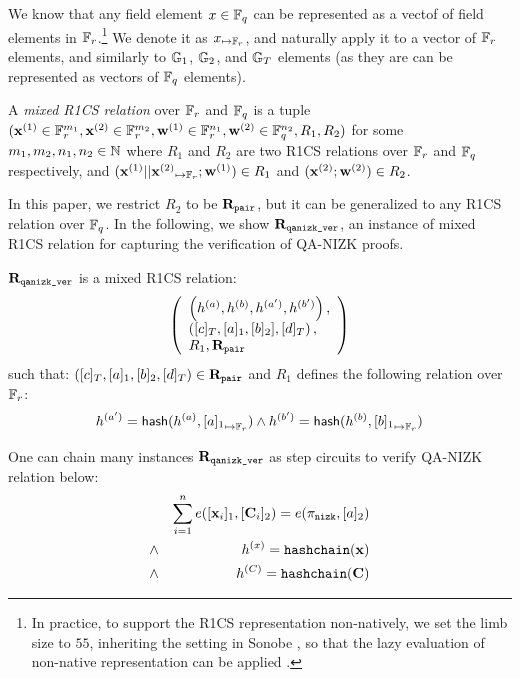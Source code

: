 We know that any field element $x \in \mathbb{F}_q$ can be represented as 
a vectof of field elements in $\mathbb{F}_r$.\footnote{In practice, to support
the R1CS representation non-natively, we set the limb size to $55$,
inheriting the setting in Sonobe \cite{Sonobe}, so that the lazy evaluation
of non-native representation can be applied \cite{JSnark}.}
We denote it as ${x}_{\mapsto \mathbb{F}_r}$, and naturally apply it to a vector
of $\mathbb{F}_r$ elements, and similarly to ${\mathbb{G}}_1$, ${\mathbb{G}}_2$, and ${\mathbb{G}}_T$
elements (as they are can be represented as vectors of $\mathbb{F}_q$ elements).

\begin{definition} A {\em mixed R1CS relation} over $\mathbb{F}_r$ and $\mathbb{F}_q$
is a tuple $({{\mathbf {x}}}^{(1)} \in \mathbb{F}_r^{m_1}, {{\mathbf {x}}}^{(2)} \in \mathbb{F}_r^{m_2}, 
{{\mathbf {w}}}^{(1)} \in \mathbb{F}_r^{n_1}, {{\mathbf {w}}}^{(2)} \in \mathbb{F}_q^{n_2}, R_1, R_2)$
for some $m_1, m_2, n_1, n_2 \in \mathbb{N}$ where
$R_1$ and $R_2$ are two R1CS relations over $\mathbb{F}_r$ and $\mathbb{F}_q$
respectively, and $({{\mathbf {x}}}^{(1)} || {{{\mathbf {x}}}^{(2)}}_{\mapsto \mathbb{F}_r}; {{\mathbf {w}}}^{(1)}) \in R_1$ and $({{\mathbf {x}}}^{(2)}; {{\mathbf {w}}}^{(2)}) \in R_2$.
\end{definition}

In this paper, we restrict $R_2$ to be $\mathbf{R}_\texttt{pair}$, but it can be generalized
to any R1CS relation over $\mathbb{F}_q$.  In the following, we show 
$\mathbf{R}_\texttt{qanizk\_ver}$, an instance of mixed R1CS relation for capturing
the verification of QA-NIZK proofs.

\begin{definition} $\mathbf{R}_\texttt{qanizk\_ver}$ is a mixed R1CS relation:
\[
\left( 
  \begin{array}{l}
  	\left(h^{(a)}, h^{(b)}, h^{(a')}, h^{(b')}\right), \\ 
    \left([c]_T, [a]_1, [b]_2], [d]_T\right), \\
	R_1, \mathbf{R}_\texttt{pair}
  \end{array}
\right)
\]
such that: $([c]_T, [a]_1, [b]_2, [d]_T) \in \mathbf{R}_\texttt{pair}$ and
$R_1$ defines the following relation over $\mathbb{F}_r$:
\[
	h^{(a')} = \mathsf{hash}(h^{(a)}, {[a]_1}_{\mapsto \mathbb{F}_r})  \wedge
	h^{(b')} = \mathsf{hash}(h^{(b)}, {[b]_1}_{\mapsto \mathbb{F}_r}) 
\]
\end{definition}

One can chain many instances $\mathbf{R}_\texttt{qanizk\_ver}$ as step
circuits to verify QA-NIZK relation below: 
\begin{eqnarray}
	& &\sum_{i=1}^n e([{{\mathbf {x}}}_i]_1, [{{\mathbf {C}}}_i]_2) = e(\pi_\texttt{nizk}, [a]_2) \\
	&\wedge& h^{(x)} =\texttt{hashchain}({{\mathbf {x}}}) \\
	&\wedge& h^{(C)} =\texttt{hashchain}({{\mathbf {C}}})
\end{eqnarray}

